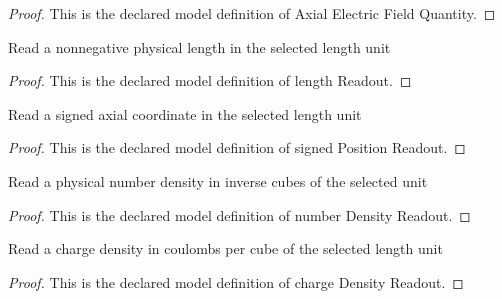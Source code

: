 \begin{proof}
  This is the declared model definition of Axial Electric Field Quantity.
\end{proof}
\begin{definition}
  \label{def:physics:phyx-mini-0630:phyxminiproblems-problemphyxmini0630-lengthreadout}
  Read a nonnegative physical length in the selected length unit
\end{definition}
\begin{proof}
  This is the declared model definition of length Readout.
\end{proof}
\begin{definition}
  \label{def:physics:phyx-mini-0630:phyxminiproblems-problemphyxmini0630-signedpositionreadout}
  Read a signed axial coordinate in the selected length unit
\end{definition}
\begin{proof}
  This is the declared model definition of signed Position Readout.
\end{proof}
\begin{definition}
  \label{def:physics:phyx-mini-0630:phyxminiproblems-problemphyxmini0630-numberdensityreadout}
  Read a physical number density in inverse cubes of the selected unit
\end{definition}
\begin{proof}
  This is the declared model definition of number Density Readout.
\end{proof}
\begin{definition}
  \label{def:physics:phyx-mini-0630:phyxminiproblems-problemphyxmini0630-chargedensityreadout}
  Read a charge density in coulombs per cube of the selected length unit
\end{definition}
\begin{proof}
  This is the declared model definition of charge Density Readout.
\end{proof}
